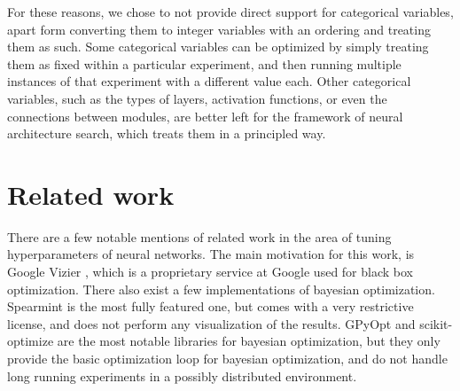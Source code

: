 For these reasons, we chose to not provide direct support for categorical
variables, apart form converting them to integer variables with an ordering and
treating them as such. Some categorical variables can be optimized by simply
treating them as fixed within a particular experiment, and then running
multiple instances of that experiment with a different value each. Other
categorical variables, such as the types of layers, activation functions, or
even the connections between modules, are better left for the framework of
neural architecture search, which treats them in a principled way.


\section{Related work}

There are a few notable mentions of related work in the area of tuning
hyperparameters of neural networks. The main motivation for this work, is
Google Vizier \citep{google-vizier}, which is a proprietary service at Google
used for black box optimization. There also exist a few implementations of
bayesian optimization. Spearmint \citep{spearmint} is the most fully featured
one, but comes with a very restrictive license, and does not perform any
visualization of the results. GPyOpt \citep{gpyopt2016} and scikit-optimize
\citep{scikit-optimize} are the most notable libraries for bayesian
optimization, but they only provide the basic optimization loop for bayesian
optimization, and do not handle long running experiments in a possibly
distributed environment.



